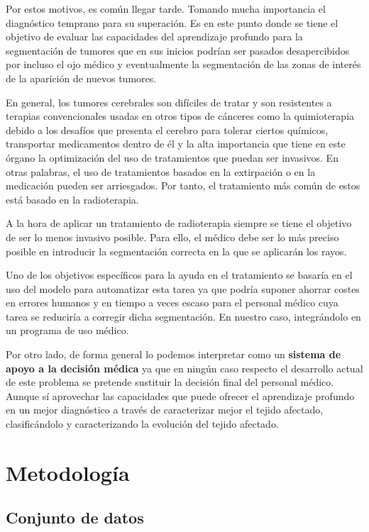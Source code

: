 Por estos motivos, es común llegar tarde. Tomando mucha importancia el diagnóstico temprano para su superación. Es en este punto donde se tiene el objetivo de evaluar las capacidades del aprendizaje profundo para la segmentación de tumores que en sus inicios podrían ser pasados desapercibidos por incluso el ojo médico y eventualmente la segmentación de las zonas de interés de la aparición de nuevos tumores.

En general, los tumores cerebrales son difíciles de tratar y son resistentes a terapias convencionales usadas en otros tipos de cánceres como la quimioterapia debido a los desafíos que presenta el cerebro para tolerar ciertos químicos, transportar medicamentos dentro de él y la alta importancia que tiene en este órgano la optimización del uso de tratamientos que puedan ser invasivos. En otras palabras, el uso de tratamientos basados en la extirpación o en la medicación pueden ser arriesgados. Por tanto, el tratamiento más común de estos está basado en la radioterapia.

A la hora de aplicar un tratamiento de radioterapia siempre se tiene el objetivo de ser lo menos invasivo posible. Para ello, el médico debe ser lo más preciso posible en introducir la segmentación correcta en la que se aplicarán los rayos. 

Uno de los objetivos específicos para la ayuda en el tratamiento se basaría en el uso del modelo para automatizar esta tarea ya que podría suponer ahorrar costes en errores humanos y en tiempo a veces escaso para el personal médico cuya tarea se reduciría a corregir dicha segmentación. En nuestro caso, integrándolo en un programa de uso médico. 

Por otro lado, de forma general lo podemos interpretar como un \textbf{sistema de apoyo a la decisión médica} ya que en ningún caso respecto el desarrollo actual de este problema se pretende sustituir la decisión final del personal médico. Aunque sí aprovechar las capacidades que puede ofrecer el aprendizaje profundo en un mejor diagnóstico a través de caracterizar mejor el tejido afectado, clasificándolo y caracterizando la evolución del tejido afectado.


\section{Metodología}

\subsection{Conjunto de datos}


